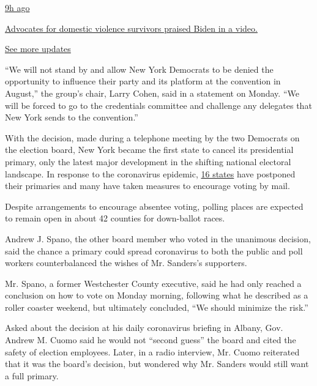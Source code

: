 \href{https://www.nytimes3xbfgragh.onion/live/2020/08/19/us/dnc-convention-election?action=click\&pgtype=Article\&state=default\&region=MAIN_CONTENT_1\&context=storylines_live_updates\#advocates-for-domestic-violence-survivors-praised-biden-in-a-video}{9h
ago}

\href{https://www.nytimes3xbfgragh.onion/live/2020/08/19/us/dnc-convention-election?action=click\&pgtype=Article\&state=default\&region=MAIN_CONTENT_1\&context=storylines_live_updates\#advocates-for-domestic-violence-survivors-praised-biden-in-a-video}{Advocates
for domestic violence survivors praised Biden in a video.}

\href{https://www.nytimes3xbfgragh.onion/live/2020/08/19/us/dnc-convention-election?action=click\&pgtype=Article\&state=default\&region=MAIN_CONTENT_1\&context=storylines_live_updates}{See
more updates}

``We will not stand by and allow New York Democrats to be denied the
opportunity to influence their party and its platform at the convention
in August,'' the group's chair, Larry Cohen, said in a statement on
Monday. ``We will be forced to go to the credentials committee and
challenge any delegates that New York sends to the convention.''

With the decision, made during a telephone meeting by the two Democrats
on the election board, New York became the first state to cancel its
presidential primary, only the latest major development in the shifting
national electoral landscape. In response to the coronavirus epidemic,
\href{https://www.nytimes3xbfgragh.onion/article/2020-campaign-primary-calendar-coronavirus.html}{16
states} have postponed their primaries and many have taken measures to
encourage voting by mail.

Despite arrangements to encourage absentee voting, polling places are
expected to remain open in about 42 counties for down-ballot races.

Andrew J. Spano, the other board member who voted in the unanimous
decision, said the chance a primary could spread coronavirus to both the
public and poll workers counterbalanced the wishes of Mr. Sanders's
supporters.

Mr. Spano, a former Westchester County executive, said he had only
reached a conclusion on how to vote on Monday morning, following what he
described as a roller coaster weekend, but ultimately concluded, ``We
should minimize the risk.''

Asked about the decision at his daily coronavirus briefing in Albany,
Gov. Andrew M. Cuomo said he would not ``second guess'' the board and
cited the safety of election employees. Later, in a radio interview, Mr.
Cuomo reiterated that it was the board's decision, but wondered why Mr.
Sanders would still want a full primary.

